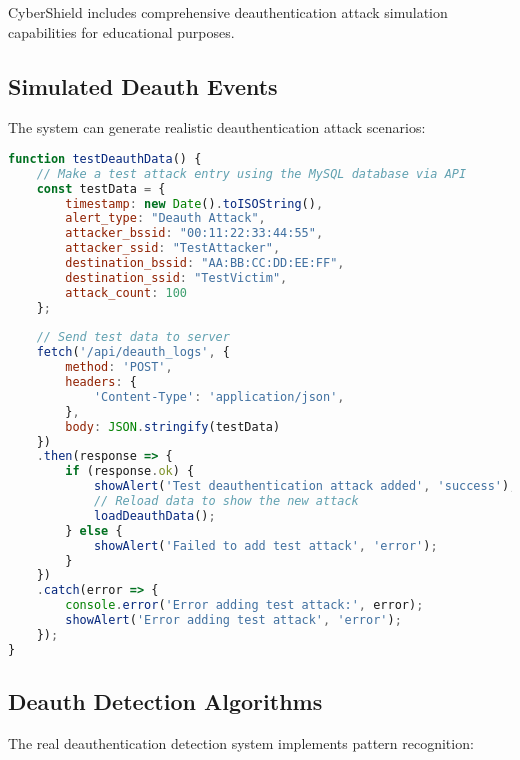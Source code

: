 \documentclass[12pt,a4paper]{report}
\begin{document}
CyberShield includes comprehensive deauthentication attack simulation capabilities for educational purposes.

\subsection{Simulated Deauth Events}

The system can generate realistic deauthentication attack scenarios:

\begin{lstlisting}[language=JavaScript,caption={Deauth Attack Test Data Generator}]
function testDeauthData() {
    // Make a test attack entry using the MySQL database via API
    const testData = {
        timestamp: new Date().toISOString(),
        alert_type: "Deauth Attack",
        attacker_bssid: "00:11:22:33:44:55",
        attacker_ssid: "TestAttacker",
        destination_bssid: "AA:BB:CC:DD:EE:FF",
        destination_ssid: "TestVictim",
        attack_count: 100
    };
    
    // Send test data to server
    fetch('/api/deauth_logs', {
        method: 'POST',
        headers: {
            'Content-Type': 'application/json',
        },
        body: JSON.stringify(testData)
    })
    .then(response => {
        if (response.ok) {
            showAlert('Test deauthentication attack added', 'success');
            // Reload data to show the new attack
            loadDeauthData();
        } else {
            showAlert('Failed to add test attack', 'error');
        }
    })
    .catch(error => {
        console.error('Error adding test attack:', error);
        showAlert('Error adding test attack', 'error');
    });
}
\end{lstlisting}

\subsection{Deauth Detection Algorithms}

The real deauthentication detection system implements pattern recognition:
\end{document}
